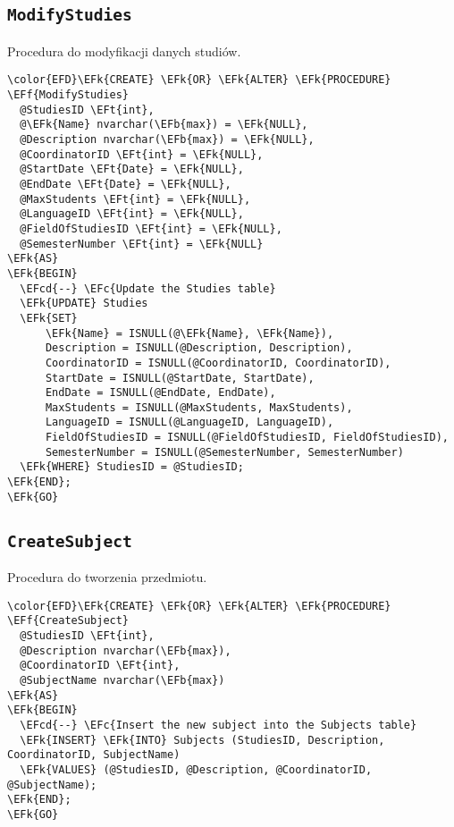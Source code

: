 \documentclass[11pt]{article}
\newcommand{\EFc}[1]{\textcolor{EFc}{\textit{#1}}} %
\newcommand{\EFcd}[1]{\textcolor{EFcd}{\textit{#1}}} %
\newcommand{\EFk}[1]{\textcolor{EFk}{\textbf{#1}}} %
\newcommand{\EFb}[1]{\textcolor{EFb}{\textbf{#1}}} %
\newcommand{\EFf}[1]{\textcolor{EFf}{#1}} %
\newcommand{\EFt}[1]{\textcolor{EFt}{\textbf{#1}}} %
\begin{document}
\subsection{\texttt{ModifyStudies}}
\label{sec:orgab48394}
Procedura do modyfikacji danych studiów.
\begin{Code}
\begin{Verbatim}
\color{EFD}\EFk{CREATE} \EFk{OR} \EFk{ALTER} \EFk{PROCEDURE} \EFf{ModifyStudies}
  @StudiesID \EFt{int},
  @\EFk{Name} nvarchar(\EFb{max}) = \EFk{NULL},
  @Description nvarchar(\EFb{max}) = \EFk{NULL},
  @CoordinatorID \EFt{int} = \EFk{NULL},
  @StartDate \EFt{Date} = \EFk{NULL},
  @EndDate \EFt{Date} = \EFk{NULL},
  @MaxStudents \EFt{int} = \EFk{NULL},
  @LanguageID \EFt{int} = \EFk{NULL},
  @FieldOfStudiesID \EFt{int} = \EFk{NULL},
  @SemesterNumber \EFt{int} = \EFk{NULL}
\EFk{AS}
\EFk{BEGIN}
  \EFcd{--} \EFc{Update the Studies table}
  \EFk{UPDATE} Studies
  \EFk{SET} 
      \EFk{Name} = ISNULL(@\EFk{Name}, \EFk{Name}),
      Description = ISNULL(@Description, Description),
      CoordinatorID = ISNULL(@CoordinatorID, CoordinatorID),
      StartDate = ISNULL(@StartDate, StartDate),
      EndDate = ISNULL(@EndDate, EndDate),
      MaxStudents = ISNULL(@MaxStudents, MaxStudents),
      LanguageID = ISNULL(@LanguageID, LanguageID),
      FieldOfStudiesID = ISNULL(@FieldOfStudiesID, FieldOfStudiesID),
      SemesterNumber = ISNULL(@SemesterNumber, SemesterNumber)
  \EFk{WHERE} StudiesID = @StudiesID;
\EFk{END};
\EFk{GO}
\end{Verbatim}
\end{Code}
\subsection{\texttt{CreateSubject}}
\label{sec:orgc820595}
Procedura do tworzenia przedmiotu.
\begin{Code}
\begin{Verbatim}
\color{EFD}\EFk{CREATE} \EFk{OR} \EFk{ALTER} \EFk{PROCEDURE} \EFf{CreateSubject}
  @StudiesID \EFt{int},
  @Description nvarchar(\EFb{max}),
  @CoordinatorID \EFt{int},
  @SubjectName nvarchar(\EFb{max})
\EFk{AS}
\EFk{BEGIN}
  \EFcd{--} \EFc{Insert the new subject into the Subjects table}
  \EFk{INSERT} \EFk{INTO} Subjects (StudiesID, Description, CoordinatorID, SubjectName)
  \EFk{VALUES} (@StudiesID, @Description, @CoordinatorID, @SubjectName);
\EFk{END};
\EFk{GO}
\end{Verbatim}
\end{Code}
\end{document}
